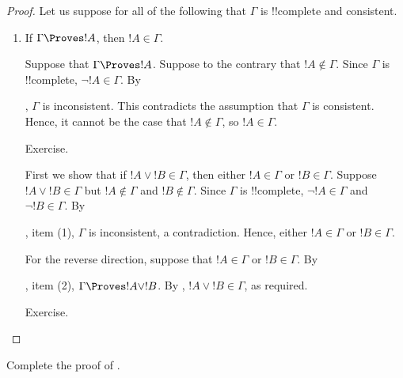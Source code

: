 \begin{proof}
Let us suppose for all of the following that $\Gamma$ is !!{complete} and
consistent.
\begin{enumerate}
\item If $\Gamma \Proves !A$, then $!A \in \Gamma$.

Suppose that $\Gamma \Proves !A$. Suppose to the contrary that $!A
\notin \Gamma$. Since $\Gamma$ is !!{complete}, $\lnot !A \in \Gamma$.
By

  ,
$\Gamma$ is inconsistent. This contradicts the assumption that
$\Gamma$ is consistent. Hence, it cannot be the case that $!A \notin
\Gamma$, so $!A \in \Gamma$.


Exercise.



First we show that if $!A \lor !B \in \Gamma$, then either $!A \in
\Gamma$ or $!B \in \Gamma$. Suppose $!A \lor !B \in \Gamma$ but $!A
\notin \Gamma$ and $!B \notin \Gamma$.  Since $\Gamma$ is
!!{complete}, $\lnot !A \in \Gamma$ and $\lnot !B \in \Gamma$. By

  ,
item (1), $\Gamma$ is inconsistent, a contradiction. Hence, either $!A
\in \Gamma$ or $!B \in \Gamma$.

For the reverse direction, suppose that $!A \in \Gamma$ or $!B \in
\Gamma$. By

  , item (2),
$\Gamma \Proves !A \lor !B$. By , $!A \lor
!B \in \Gamma$, as required.


Exercise.
\end{enumerate}
\end{proof}




\begin{prob}
Complete the proof of .
\end{prob}








